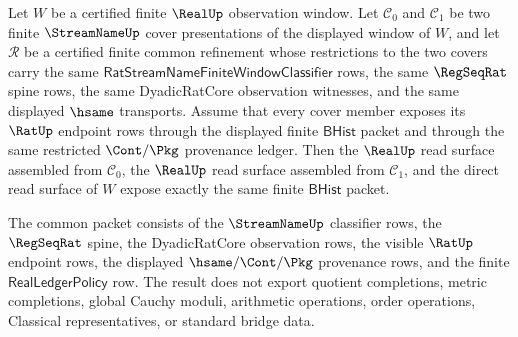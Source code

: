 \begin{theorem}
\label{thm:realup-window-refinement-cover-pullback-exhaustion}
Let $W$ be a certified finite $\RealUp$ observation window. Let
$\mathcal{C}_0$ and $\mathcal{C}_1$ be two finite $\StreamNameUp$ cover
presentations of the displayed window of $W$, and let $\mathcal{R}$ be a
certified finite common refinement whose restrictions to the two covers carry
the same $\mathsf{RatStreamNameFiniteWindowClassifier}$ rows, the same
$\RegSeqRat$ spine rows, the same DyadicRatCore observation witnesses, and the
same displayed $\hsame$ transports. Assume that every cover member exposes its
$\RatUp$ endpoint rows through the displayed finite $\mathsf{BHist}$ packet
and through the same restricted $\Cont/\Pkg$ provenance ledger. Then the
$\RealUp$ read surface assembled from $\mathcal{C}_0$, the $\RealUp$ read
surface assembled from $\mathcal{C}_1$, and the direct read surface of $W$
expose exactly the same finite $\mathsf{BHist}$ packet.

The common packet consists of the $\StreamNameUp$ classifier rows, the
$\RegSeqRat$ spine, the DyadicRatCore observation rows, the visible
$\RatUp$ endpoint rows, the displayed $\hsame/\Cont/\Pkg$ provenance rows, and
the finite $\mathsf{RealLedgerPolicy}$ row. The result does not export quotient
completions, metric completions, global Cauchy moduli, arithmetic operations,
order operations, Classical representatives, or standard bridge data.
\end{theorem}
